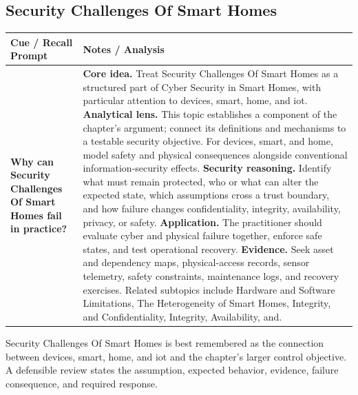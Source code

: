 \documentclass[11pt]{article}
\newcommand{\CornellHeader}{%
\rowcolor{Navy}\color{white}\bfseries Cue / Recall Prompt & \color{white}\bfseries Notes / Analysis\\\hline}
\newcommand{\CornellRow}[2]{%
\cellcolor{CueGray}\RaggedRight\textbf{#1} & \RaggedRight #2\\\hline}
\begin{document}
\subsection*{Security Challenges Of Smart Homes}
\begin{longtable}{>{\RaggedRight\arraybackslash}p{}|>{\RaggedRight\arraybackslash}p{}}
\CornellHeader
\CornellRow{Why can Security Challenges Of Smart Homes fail in practice?}{\textbf{Core idea.} Treat Security Challenges Of Smart Homes as a structured part of Cyber Security in Smart Homes, with particular attention to devices, smart, home, and iot. \textbf{Analytical lens.} This topic establishes a component of the chapter's argument; connect its definitions and mechanisms to a testable security objective. For devices, smart, and home, model safety and physical consequences alongside conventional information-security effects. \textbf{Security reasoning.} Identify what must remain protected, who or what can alter the expected state, which assumptions cross a trust boundary, and how failure changes confidentiality, integrity, availability, privacy, or safety. \textbf{Application.} The practitioner should evaluate cyber and physical failure together, enforce safe states, and test operational recovery. \textbf{Evidence.} Seek asset and dependency maps, physical-access records, sensor telemetry, safety constraints, maintenance logs, and recovery exercises. Related subtopics include Hardware and Software Limitations, The Heterogeneity of Smart Homes, Integrity, and Confidentiality, Integrity, Availability, and.}
\end{longtable}
\begin{topicsummary}
Security Challenges Of Smart Homes is best remembered as the connection between devices, smart, home, and iot and the chapter's larger control objective. A defensible review states the assumption, expected behavior, evidence, failure consequence, and required response.
\end{topicsummary}
\end{document}
